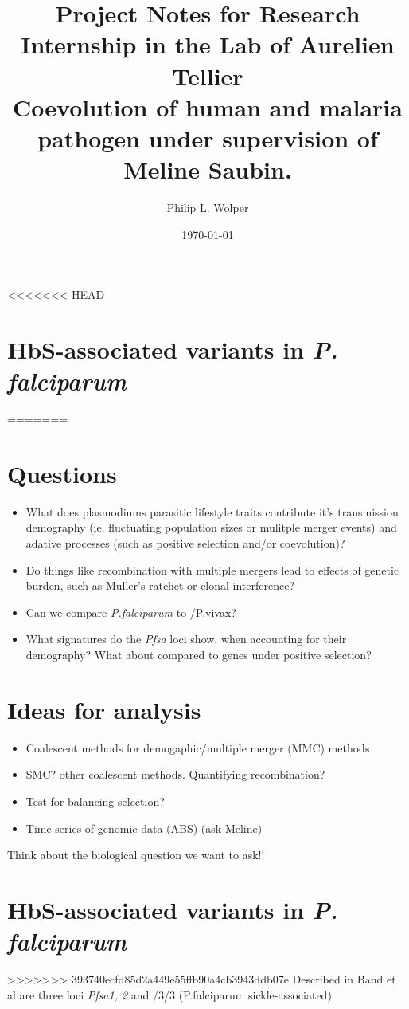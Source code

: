 \documentclass[11pt]{article}
\author{Philip L. Wolper}
\date{\today}
\title{Project Notes for Research Internship in the Lab of Aurelien Tellier\\\medskip
\large Coevolution of human and malaria pathogen under supervision of Meline Saubin.}
\begin{document}
\maketitle


<<<<<<< HEAD
\section{HbS-associated variants in \emph{P. falciparum}}
\label{sec:org7d99933}
=======
\section{Questions}
\label{sec:org385462e}
\begin{itemize}
\item What does plasmodiums parasitic lifestyle traits contribute it's transmission demography (ie. fluctuating population sizes or mulitple merger events) and adative processes (such as  positive selection and/or coevolution)?
\item Do things like recombination with multiple mergers lead to effects of genetic burden, such as Muller's ratchet or clonal interference?
\item Can we compare \emph{P.falciparum} to /P.vivax?
\item What signatures do the \emph{Pfsa} loci show, when accounting for their demography? What about compared to genes under positive selection?
\end{itemize}

\section{Ideas for analysis}
\label{sec:org9c3313a}
\begin{itemize}
\item Coalescent methods for demogaphic/multiple merger (MMC) methods
\cite{korfmann-2023-simul-infer}
\item SMC? other coalescent methods. Quantifying recombination?
\item Test for balancing selection?
\item Time series of genomic data (ABS) (ask  Meline)
\end{itemize}

Think about the biological question we want to ask!!

\section{HbS-associated variants in \emph{P. falciparum}}
\label{sec:orgfdb52d1}
>>>>>>> 393740ecfd85d2a449e55ffb90a4cb3943ddb07e
Described in Band et al are three loci \emph{Pfsa1, 2} and /3/3 (P.falciparum sickle-associated)
\end{document}
